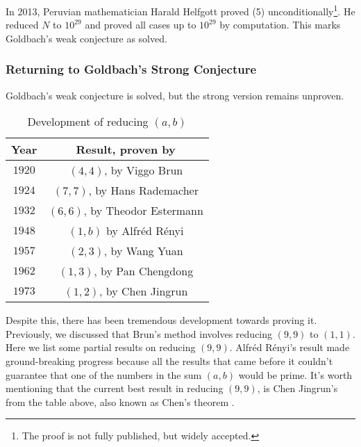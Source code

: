 \documentclass{article}
\begin{document}
In 2013, Peruvian mathematician Harald Helfgott proved (5) unconditionally\footnote{The proof is not fully published, but widely accepted.}\cite{wi}. He reduced $N$ to $10^{29}$ and proved all cases up to $10^{29}$ by computation\cite{wi}. This marks Goldbach's weak conjecture as solved.
\newpage
\subsubsection*{Returning to Goldbach's Strong Conjecture}
Goldbach's weak conjecture is solved, but the strong version remains unproven. 
\begin{wraptable}[10]{r}{7cm}
    \centering
    \begin{tabular}{|c|c|}
    \hline
    \textbf{Year} & \textbf{Result, proven by} \\ \hline
    $1920$ & $(4,4)$, by Viggo Brun\\ \hline
    $1924$ & $(7,7)$, by Hans Rademacher \\ \hline
    $1932$ & $(6,6)$, by Theodor Estermann \\ \hline
    $1948$ & $(1, b)$ by Alfréd Rényi\\ \hline
    $1957$ & $(2,3)$, by Wang Yuan\\ \hline
    $1962$ & $(1,3)$, by Pan Chengdong\\ \hline
    $1973$ & $(1,2)$, by Chen Jingrun \\ \hline
    \end{tabular}
    \caption{Development of reducing $(a,b)$\cite{pan}}
\end{wraptable}
Despite this, there has been tremendous development towards proving it. Previously, we discussed that Brun's method involves reducing $(9,9)$ to $(1,1)$. Here we list some partial results on reducing $(9,9)$.
Alfréd Rényi's result made ground-breaking progress because all the results that came before it couldn't guarantee that one of the numbers in the sum $(a, b)$ would be prime. It's worth mentioning that the current best result in reducing $(9,9)$, is Chen Jingrun's from the table above, also known as Chen's theorem \cite{pan}.
\end{document}

